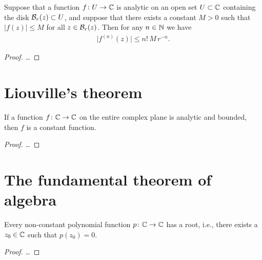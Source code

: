 \begin{lemma}
  \label{lem:cauchy_derivative_estimate}
  Suppose that a function $f \colon U \to \mathbb{C}$ is analytic on an open
  set $U \subset \mathbb{C}$ containing the disk $\mathcal{B}_{{r}}(z) \subset U$,
  and suppose that there exists a constant $M>0$ such that
  $|f(z)| \le M$ for all $z \in \mathcal{B}_{{r}}(z)$.
  Then for any $n \in \mathbb{N}$ we have
  \begin{align*}
    \big| f^{(n)}(z) \big| \le n! \, M \, r^{-n} .
  \end{align*}
\end{lemma}
\begin{proof}
  \ldots
\end{proof}



\section{Liouville's theorem}

\begin{theorem}
  \label{thm:liouville}
  If a function $f \colon \mathbb{C} \to \mathbb{C}$ on the entire complex plane
  is analytic and bounded, then $f$ is a constant function.
\end{theorem}
\begin{proof}
  \ldots
\end{proof}



\section{The fundamental theorem of algebra}

\begin{theorem}
  \label{thm:fundamental_theorem_of_algebra}
  Every non-constant polynomial function $p \colon \mathbb{C} \to \mathbb{C}$
  has a root, i.e., there exists a $z_0 \in \mathbb{C}$ such that $p(z_0) = 0$.
\end{theorem}
\begin{proof}
  \ldots
\end{proof}

